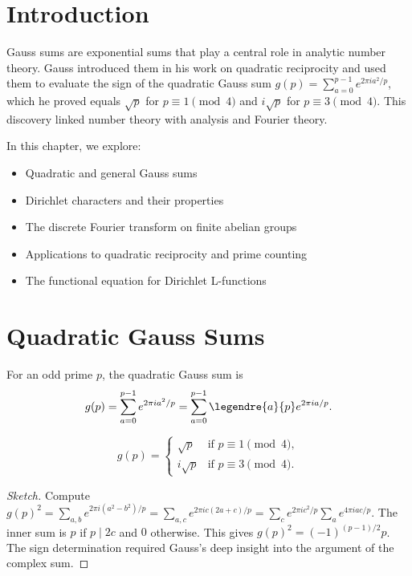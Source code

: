 \section{Introduction}

Gauss sums  are exponential sums that play a central role in analytic number theory. Gauss introduced them in his work on quadratic reciprocity and used them to evaluate the sign of the quadratic Gauss sum  $g(p) = \sum_{a=0}^{p-1} e^{2\pi i a^2/p}$, which he proved equals $\sqrt{p}$ for $p \equiv 1 \pmod{4}$ and $i\sqrt{p}$ for $p \equiv 3 \pmod{4}$. This discovery linked number theory with analysis and Fourier theory.

In this chapter, we explore:
\begin{itemize}
    \item Quadratic and general Gauss sums
    \item Dirichlet characters  and their properties
    \item The discrete Fourier transform  on finite abelian groups
    \item Applications to quadratic reciprocity and prime counting
    \item The functional equation for Dirichlet L-functions 
\end{itemize}

\section{Quadratic Gauss Sums}

\begin{definition}
For an odd prime $p$, the quadratic Gauss sum is
\[
g(p) = \sum_{a=0}^{p-1} e^{2\pi i a^2/p} = \sum_{a=0}^{p-1} \legendre{a}{p} e^{2\pi i a/p}.
\]
\end{definition}

\begin{theorem}
\[
g(p) = \begin{cases}
\sqrt{p} & \text{if } p \equiv 1 \pmod{4}, \\
i\sqrt{p} & \text{if } p \equiv 3 \pmod{4}.
\end{cases}
\]
\end{theorem}

\begin{proof}[Sketch]
Compute $g(p)^2 = \sum_{a,b} e^{2\pi i (a^2-b^2)/p} = \sum_{a,c} e^{2\pi i c(2a+c)/p} = \sum_c e^{2\pi i c^2/p} \sum_a e^{4\pi i ac/p}$. The inner sum is $p$ if $p \mid 2c$ and $0$ otherwise. This gives $g(p)^2 = (-1)^{(p-1)/2} p$. The sign determination required Gauss's deep insight into the argument of the complex sum.
\end{proof}

